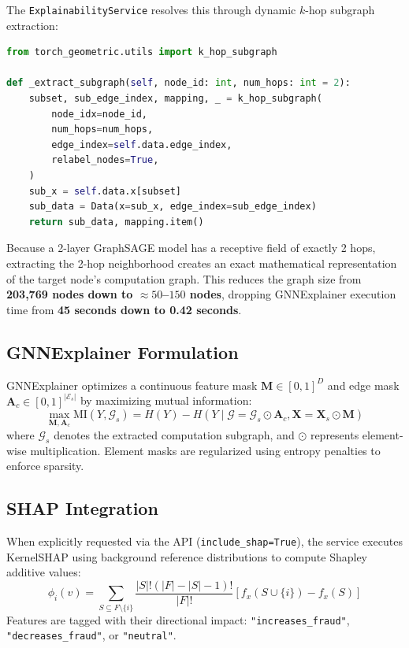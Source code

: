 \documentclass[11pt,a4paper]{report}
\begin{document}
The \texttt{ExplainabilityService} resolves this through dynamic $k$-hop subgraph extraction:
\begin{lstlisting}[language=Python, caption={Sub-Graph Extraction in src/services/explainability.py}]
from torch_geometric.utils import k_hop_subgraph

def _extract_subgraph(self, node_id: int, num_hops: int = 2):
    subset, sub_edge_index, mapping, _ = k_hop_subgraph(
        node_idx=node_id,
        num_hops=num_hops,
        edge_index=self.data.edge_index,
        relabel_nodes=True,
    )
    sub_x = self.data.x[subset]
    sub_data = Data(x=sub_x, edge_index=sub_edge_index)
    return sub_data, mapping.item()
\end{lstlisting}
Because a 2-layer GraphSAGE model has a receptive field of exactly 2 hops, extracting the 2-hop neighborhood creates an exact mathematical representation of the target node's computation graph. This reduces the graph size from \textbf{203,769 nodes down to $\approx 50$--$150$ nodes}, dropping GNNExplainer execution time from \textbf{45 seconds down to 0.42 seconds}.

\subsection{GNNExplainer Formulation}
GNNExplainer optimizes a continuous feature mask $\mathbf{M} \in [0, 1]^D$ and edge mask $\mathbf{A}_c \in [0, 1]^{|\mathcal{E}_s|}$ by maximizing mutual information:
\[
\max_{\mathbf{M}, \mathbf{A}_c} \text{MI}(Y, \mathcal{G}_s) = H(Y) - H(Y \mid \mathcal{G} = \mathcal{G}_s \odot \mathbf{A}_c, \mathbf{X} = \mathbf{X}_s \odot \mathbf{M})
\]
where $\mathcal{G}_s$ denotes the extracted computation subgraph, and $\odot$ represents element-wise multiplication. Element masks are regularized using entropy penalties to enforce sparsity.

\subsection{SHAP Integration}
When explicitly requested via the API (\texttt{include\_shap=True}), the service executes KernelSHAP using background reference distributions to compute Shapley additive values:
\[
\phi_i(v) = \sum_{S \subseteq F \setminus \{i\}} \frac{|S|! (|F| - |S| - 1)!}{|F|!} \left[ f_x(S \cup \{i\}) - f_x(S) \right]
\]
Features are tagged with their directional impact: \texttt{"increases\_fraud"}, \texttt{"decreases\_fraud"}, or \texttt{"neutral"}.
\end{document}
